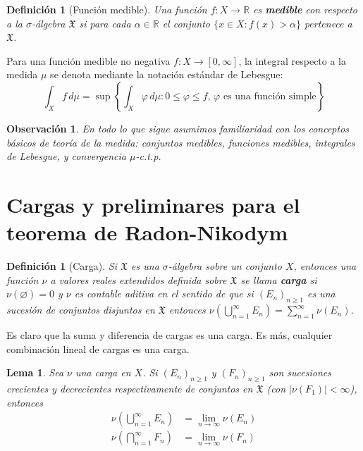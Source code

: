 \documentclass[12pt,a4paper]{article}
\theoremstyle{profesional}
\newtheorem{lemma}[teorema]{Lema}
\theoremstyle{definicion-style}
\newtheorem{definicion}[teorema]{Definición}
\newtheorem{observacion}[teorema]{Observación}
\newcommand{\R}{\mathbb{R}}
\newcommand{\X}{\mathfrak{X}}
\begin{document}
\begin{definicion}[Función medible]
    Una función \( f : X \to \R \) es \textbf{medible} con respecto a la \( \sigma \)-álgebra \( \X \) si
    para cada \( \alpha \in \R \) el conjunto \( \{ x \in X : f(x) > \alpha \} \) pertenece a \( \X \).
\end{definicion}

Para una función medible no negativa \(f: X \to [0, \infty]\), la integral respecto a la medida \(\mu \) se denota mediante la notación estándar de Lebesgue:
\[
    \int_X f \, d\mu = \sup \left \{ \int_X \varphi \, d\mu : 0 \leq \varphi \leq f, \, \varphi \text{ es una función simple} \right \}
\]

\begin{observacion}
    En todo lo que sigue asumimos familiaridad con los conceptos básicos de teoría de la medida: conjuntos medibles, funciones medibles, integrales de Lebesgue, y convergencia \( \mu \)-c.t.p.
\end{observacion}

\section{Cargas y preliminares para el teorema de Radon-Nikodym}

\begin{definicion}[Carga]
    Si \( \X \) es una \( \sigma \)-álgebra sobre un conjunto \( X \), entonces una función \( \nu \) a valores reales extendidos definida sobre \( \X \)
    se llama \textbf{carga} si \( \nu(\varnothing) = 0 \) y \( \nu \) es contable aditiva en el sentido de que si \( {(E_n)}_{n \geq 1} \)
    es una sucesión de conjuntos disjuntos en \( \X \) entonces \( \nu\left(\bigcup_{n=1}^\infty E_n\right) = \sum_{n=1}^\infty \nu(E_n) \).
\end{definicion}

Es claro que la suma y diferencia de cargas es una carga. Es más, cualquier combinación lineal de cargas es una carga.

\begin{lemma}
    Sea \( \nu \) una carga en \( X \). Si \( {(E_n)}_{n \geq 1} \) y \( {(F_n)}_{n \geq 1} \) son sucesiones crecientes y decrecientes respectivamente de conjuntos en \( \X \) (con \( |\nu(F_1)| < \infty \)), entonces
    \begin{align*}
        \nu\left(\bigcup_{n=1}^\infty E_n\right) & = \lim_{n \to \infty} \nu(E_n) \\
        \nu\left(\bigcap_{n=1}^\infty F_n\right) & = \lim_{n \to \infty} \nu(F_n)
    \end{align*}
\end{lemma}
\end{document}
